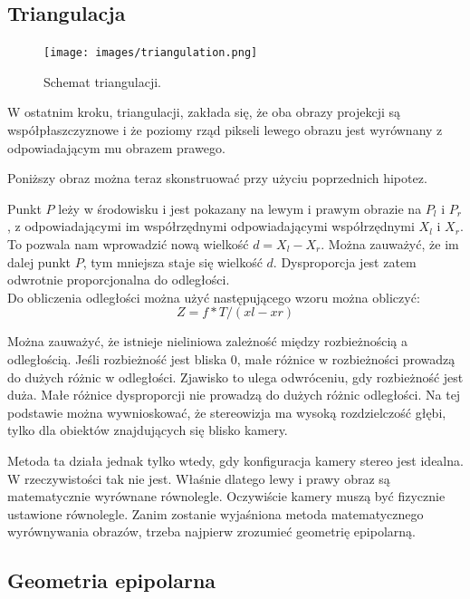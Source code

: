 \documentclass[magisterska]{pracadypl}
\begin{document}
\subsection{Triangulacja}

\begin{figure}[H]  %
    \centering  %
    \texttt{[image: images/triangulation.png]}  %
    \captionsetup{font=footnotesize}
    \caption[Schemat triangulacji. Learning OpenCV 3, O'Reilly, Str. 705]{Schemat triangulacji.}
    \label{fig:rpi}  %
\end{figure}

W ostatnim kroku, triangulacji, zakłada się, że oba obrazy projekcji są współpłaszczyznowe i że poziomy rząd pikseli lewego obrazu jest wyrównany z odpowiadającym mu obrazem prawego.

Poniższy obraz można teraz skonstruować przy użyciu poprzednich hipotez.

Punkt $P$ leży w środowisku i jest pokazany na
lewym i prawym obrazie na $P_l$ i $P_r$, z odpowiadającymi im współrzędnymi
odpowiadającymi współrzędnymi $X_l$ i $X_r$. To pozwala nam wprowadzić nową wielkość $d = X_l - X_r$.
Można zauważyć, że im dalej punkt $P$, tym mniejsza staje się wielkość $d$. Dysproporcja jest zatem odwrotnie proporcjonalna do odległości.\\
Do obliczenia odległości można użyć następującego wzoru można obliczyć: \[Z=f*T/(xl-xr)\]

Można zauważyć, że istnieje nieliniowa zależność między rozbieżnością a odległością.
Jeśli rozbieżność jest bliska 0, małe różnice w rozbieżności prowadzą do dużych różnic w odległości.
Zjawisko to ulega odwróceniu, gdy rozbieżność jest duża. Małe różnice dysproporcji nie prowadzą do dużych różnic odległości. Na tej podstawie można wywnioskować, że stereowizja ma wysoką rozdzielczość głębi, tylko dla obiektów znajdujących się blisko kamery.

Metoda ta działa jednak tylko wtedy, gdy konfiguracja kamery stereo jest idealna. W
rzeczywistości tak nie jest. Właśnie dlatego lewy i prawy obraz są
matematycznie wyrównane równolegle. Oczywiście kamery muszą być fizycznie ustawione równolegle.
Zanim zostanie wyjaśniona metoda matematycznego wyrównywania obrazów, trzeba najpierw zrozumieć geometrię epipolarną.

\subsection{Geometria epipolarna}
\end{document}
